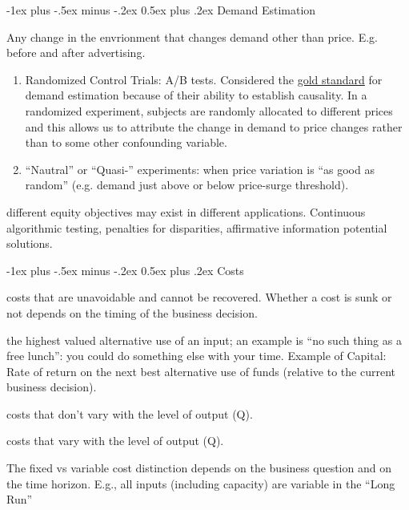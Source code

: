 \documentclass[10pt,landscape]{article}
\makeatletter
\renewcommand{\subsection}{\@startsection{subsection}{2}{0mm}%
                                {-1ex plus -.5ex minus -.2ex}%
                                {0.5ex plus .2ex}%
                                {\normalfont\normalsize\bfseries}}
\newcommand{\Blue}[1]{\noindent{\textbf{\textcolor{Blue}{#1 -}}}}
\newcommand{\Red}[1]{\noindent{\textbf{\textcolor{BrickRed}{#1 -}}}}
\newcommand{\Green}[1]{\noindent{\textbf{\textcolor{PineGreen}{#1 -}}}}
\makeatother
\begin{document}
\begin{multicols}{4}
\subsection{Demand Estimation}

\Red{Demand Shifts} Any change in the envrionment that changes demand other than price. E.g. before and after advertising.

\Blue{Estimation Techniques}
\begin{enumerate}
    \item Randomized Control Trials: A/B tests. Considered the \underline{gold standard} for demand estimation because
        of their ability to establish causality. In a randomized experiment, subjects are randomly allocated to
        different prices and this allows us to attribute the change in demand to price changes rather than to some other
        confounding variable.
    \item ``Nautral'' or ``Quasi-'' experiments: when price variation is ``as good as random'' (e.g. demand just above
        or below price-surge threshold).
\end{enumerate}

\Green{Equity Tradeoffs} different equity objectives may exist in different applications. Continuous algorithmic
testing, penalties for disparities, affirmative information potential solutions.

\subsection{Costs}

\Blue{Sunk Cost} costs that are unavoidable and cannot be recovered. Whether a cost is sunk or not depends on the timing
of the business decision.

\Blue{Opportunity Cost} the highest valued alternative use of an input; an example is ``no such thing as a free lunch'':
you could do something else with your time. Example of Capital: Rate of return on the next best alternative use of funds
(relative to the current business decision).

\Blue{Fixed Cost} costs that don't vary with the level of output (Q).

\Blue{Variable Cost} costs that vary with the level of output (Q).

The fixed vs variable cost distinction depends on the business question and on the time horizon. E.g., all inputs
(including capacity) are variable in the ``Long Run''


\end{multicols}
\end{document}
